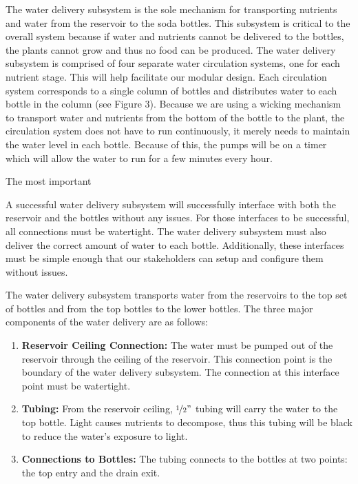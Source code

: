 \documentclass[12pt]{article}
\begin{document}

The water delivery subsystem is the sole mechanism for transporting nutrients and water from the
reservoir to the soda bottles. This subsystem is critical to the overall system because if water and
nutrients cannot be delivered to the bottles, the plants cannot grow and thus no food can be
produced. The water delivery subsystem is comprised of four separate water circulation systems, one
for each nutrient stage. This will help facilitate our modular design. Each circulation system
corresponds to a single column of bottles and distributes water to each bottle in the column (see
Figure 3).  Because we are using a wicking mechanism to transport water and nutrients from the
bottom of the bottle to the plant, the circulation system does not have to run continuously, it
merely needs to maintain the water level in each bottle. Because of this, the pumps will be on a
timer which will allow the water to run for a few minutes every hour.

The most important 

A successful water delivery subsystem will successfully interface with both the reservoir and the
bottles without any issues. For those interfaces to be successful, all connections must be
watertight. The water delivery subsystem must also deliver the correct amount of water to each
bottle. Additionally, these interfaces must be simple enough that our stakeholders can setup and
configure them without issues.

The water delivery subsystem transports water from the reservoirs to the top set of bottles and from
the top bottles to the lower bottles. The three major components of the water delivery are as
follows:

\begin{enumerate}
    \item \textbf{Reservoir Ceiling Connection:} The water must be pumped out of the reservoir
        through the ceiling of the reservoir. This connection point is the boundary of the water
        delivery subsystem. The connection at this interface point must be watertight.

    \item \textbf{Tubing:} From the reservoir ceiling, $\nicefrac{1}{2}"$ tubing will carry the
        water to the top bottle. Light causes nutrients to decompose, thus this tubing will be black
        to reduce the water's exposure to light.

    \item \textbf{Connections to Bottles:} The tubing connects to the bottles at two points: the top
        entry and the drain exit.

\end{enumerate}
\end{document}
